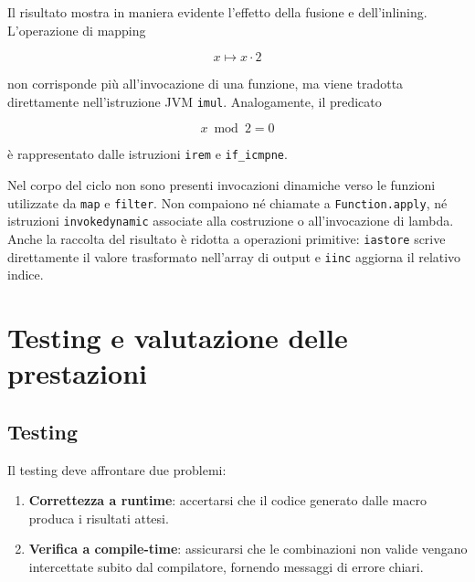 \documentclass[a4paper,11pt]{report}
\theoremstyle{definition}
\begin{document}
Il risultato mostra in maniera evidente l'effetto della fusione e dell'inlining. L'operazione di mapping

\[
  x \mapsto x \cdot 2
\]

non corrisponde più all'invocazione di una funzione, ma viene tradotta direttamente nell'istruzione JVM \texttt{imul}. Analogamente, il predicato

\[
  x \bmod 2 = 0
\]

è rappresentato dalle istruzioni \texttt{irem} e \texttt{if\_icmpne}.

Nel corpo del ciclo non sono presenti invocazioni dinamiche verso le funzioni utilizzate da \texttt{map} e \texttt{filter}. Non compaiono né chiamate a \texttt{Function.apply}, né istruzioni \texttt{invokedynamic} associate alla costruzione o all'invocazione di lambda. Anche la raccolta del risultato è ridotta a operazioni primitive: \texttt{iastore} scrive direttamente il valore trasformato nell'array di output e \texttt{iinc} aggiorna il relativo indice.

\chapter{Testing e valutazione delle prestazioni}
\label{chap:validazione}
\section{Testing}
\label{sec:strategia-testing}

Il testing deve affrontare due problemi:
\begin{enumerate}
  \item \textbf{Correttezza a runtime}: accertarsi che il codice generato dalle macro produca i risultati attesi.
  \item \textbf{Verifica a compile-time}: assicurarsi che le combinazioni non valide vengano intercettate subito dal compilatore, fornendo messaggi di errore chiari.
\end{enumerate}
\end{document}
